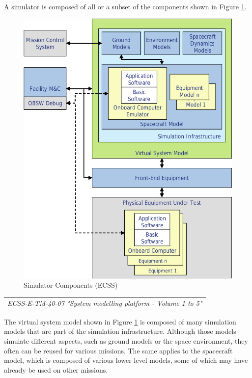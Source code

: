 A simulator is composed of all or a subset of the components shown in Figure \ref{fig:Simulator Components}.

\begin{figure}[h]
\centering\includegraphics[scale=0.45]{fig/simulator_components}
\caption{Simulator Components (ECSS)}
\label{fig:Simulator Components}
\end{figure}

\begin{tabular}{l}
\textit{ECSS-E-TM-40-07 "System modelling platform - Volume 1 to 5" \cite{ECSS-E-TM-40-07}} \\
\end{tabular}

The virtual system model shown in Figure \ref{fig:Simulator Components} is composed of many simulation models that are part of the simulation infrastructure. Although those models simulate different aspects, such as ground models or the space environment, they often can be reused for various missions. The same applies to the spacecraft model, which is composed of various lower level models, some of which may have already be used on other missions. 


